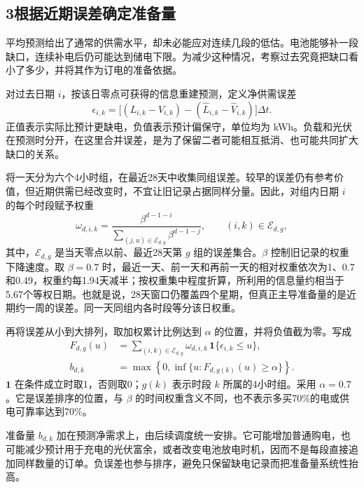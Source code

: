 \subsection*{3\quad 根据近期误差确定准备量}

平均预测给出了通常的供需水平，却未必能应对连续几段的低估。电池能够补一段缺口，连续补电后仍可能达到储电下限。为减少这种情况，考察过去究竟把缺口看小了多少，并将其作为订电的准备依据。

对过去日期 $i$，按该日零点可获得的信息重建预测，定义净供需误差
\begin{equation}
\epsilon_{i,k}=\big[(L_{i,k}-V_{i,k})-(\widehat L_{i,k}-\widehat V_{i,k})\big]\Delta t.
\label{eq:error}
\end{equation}
正值表示实际比预计更缺电，负值表示预计偏保守，单位均为 kWh。负载和光伏在预测时分开，在这里合并误差，是为了保留二者可能相互抵消、也可能共同扩大缺口的关系。

将一天分为六个4小时组，在最近28天中收集同组误差。较早的误差仍有参考价值，但近期供需已经改变时，不宜让旧记录占据同样分量。因此，对组内日期 $i$ 的每个时段赋予权重
\begin{equation}
\omega_{d,i,k}=\frac{\beta^{d-1-i}}
{\displaystyle\sum_{(j,u)\in\mathcal E_{d,g}}\beta^{d-1-j}},\qquad (i,k)\in\mathcal E_{d,g},
\label{eq:weight}
\end{equation}
其中，$\mathcal E_{d,g}$ 是当天零点以前、最近28天第 $g$ 组的误差集合。$\beta$ 控制旧记录的权重下降速度。取 $\beta=0.7$ 时，最近一天、前一天和再前一天的相对权重依次为1、0.7和0.49，权重约每1.94天减半；按权重集中程度折算，所利用的信息量约相当于5.67个等权日期。也就是说，28天窗口仍覆盖四个星期，但真正主导准备量的是近期约一周的误差。同一天同组内各时段等分该日权重。

再将误差从小到大排列，取加权累计比例达到 $\alpha$ 的位置，并将负值截为零。写成
\begin{align}
F_{d,g}(u)&=\sum_{(i,k)\in\mathcal E_{d,g}}\omega_{d,i,k}\,\mathbf{1}\{\epsilon_{i,k}\le u\},\\
b_{d,k}&=\max\left\{0,\inf\{u:F_{d,g(k)}(u)\ge\alpha\}\right\}.
\label{eq:margin}
\end{align}
$\mathbf1$ 在条件成立时取1，否则取0；$g(k)$ 表示时段 $k$ 所属的4小时组。采用 $\alpha=0.7$。它是误差排序的位置，与 $\beta$ 的时间权重含义不同，也不表示多买70\%的电或供电可靠率达到70\%。

准备量 $b_{d,k}$ 加在预测净需求上，由后续调度统一安排。它可能增加普通购电，也可能减少预计用于充电的光伏富余，或者改变电池放电时机，因而不是每段直接追加同样数量的订单。负误差也参与排序，避免只保留缺电记录而把准备量系统性抬高。

